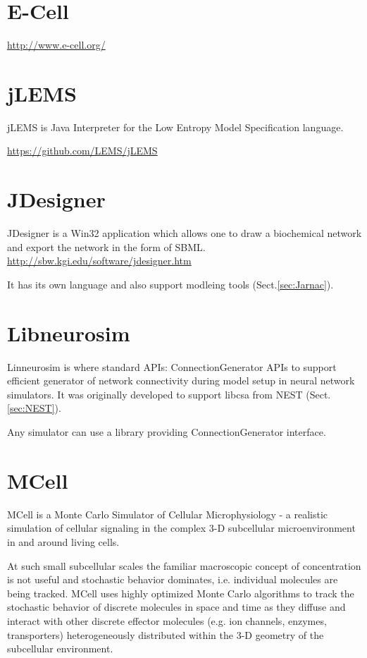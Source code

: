 \section{E-Cell}
\label{sec:E-Cell}



\url{http://www.e-cell.org/}

\section{jLEMS}
\label{sec:jLEMS}

jLEMS is Java Interpreter for the Low Entropy Model Specification language.

\url{https://github.com/LEMS/jLEMS}

\section{JDesigner}

JDesigner is a Win32 application which allows one to draw a biochemical network
and export the network in the form of SBML.
\url{http://sbw.kgi.edu/software/jdesigner.htm}

It has its own language and also support modleing tools (Sect.\ref{sec:Jarnac}).

\section{Libneurosim}
\label{sec:libneurosim}

Linneurosim is where standard APIs: ConnectionGenerator APIs
to support efficient generator of network connectivity during model setup
in neural network simulators. It was originally developed to support
libcsa from NEST (Sect.\ref{sec:NEST}).

Any simulator can use a library providing ConnectionGenerator
interface. 

\section{MCell}
\label{sec:MCell}

MCell is a Monte Carlo Simulator of Cellular Microphysiology - 
a realistic simulation of cellular signaling in the complex 3-D subcellular
microenvironment in and around living cells.

At such small subcellular scales the familiar macroscopic concept of
concentration is not useful and stochastic behavior dominates, i.e. individual
molecules are being tracked. 
MCell uses highly optimized Monte Carlo algorithms to track the stochastic
behavior of discrete molecules in space and time as they diffuse and interact
with other discrete effector molecules (e.g. ion channels, enzymes,
transporters) heterogeneously distributed within the 3-D geometry of the
subcellular environment.

